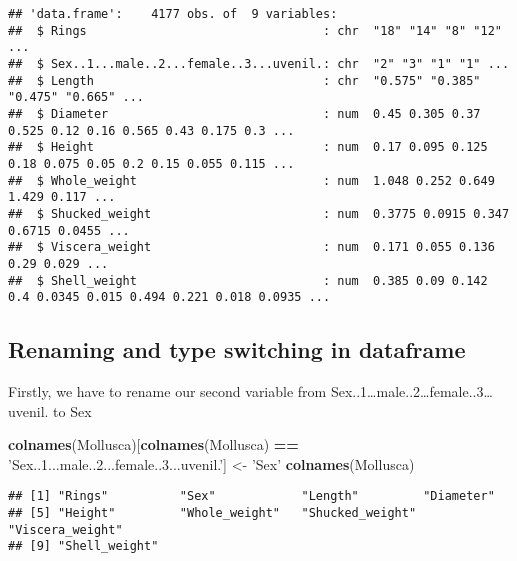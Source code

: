 \documentclass[
]{article}
\newenvironment{Shaded}{\begin{snugshade}}{\end{snugshade}}
\newcommand{\KeywordTok}[1]{\textcolor[rgb]{0.13,0.29,0.53}{\textbf{#1}}}
\newcommand{\NormalTok}[1]{#1}
\newcommand{\OperatorTok}[1]{\textcolor[rgb]{0.81,0.36,0.00}{\textbf{#1}}}
\newcommand{\StringTok}[1]{\textcolor[rgb]{0.31,0.60,0.02}{#1}}
\begin{document}
\begin{verbatim}
## 'data.frame':    4177 obs. of  9 variables:
##  $ Rings                                 : chr  "18" "14" "8" "12" ...
##  $ Sex..1...male..2...female..3...uvenil.: chr  "2" "3" "1" "1" ...
##  $ Length                                : chr  "0.575" "0.385" "0.475" "0.665" ...
##  $ Diameter                              : num  0.45 0.305 0.37 0.525 0.12 0.16 0.565 0.43 0.175 0.3 ...
##  $ Height                                : num  0.17 0.095 0.125 0.18 0.075 0.05 0.2 0.15 0.055 0.115 ...
##  $ Whole_weight                          : num  1.048 0.252 0.649 1.429 0.117 ...
##  $ Shucked_weight                        : num  0.3775 0.0915 0.347 0.6715 0.0455 ...
##  $ Viscera_weight                        : num  0.171 0.055 0.136 0.29 0.029 ...
##  $ Shell_weight                          : num  0.385 0.09 0.142 0.4 0.0345 0.015 0.494 0.221 0.018 0.0935 ...
\end{verbatim}

\hypertarget{renaming-and-type-switching-in-dataframe}{%
\subsection{Renaming and type switching in
dataframe}\label{renaming-and-type-switching-in-dataframe}}

Firstly, we have to rename our second variable from
Sex..1\ldots male..2\ldots female..3\ldots uvenil. to Sex

\begin{Shaded}
\begin{Highlighting}[]
\KeywordTok{colnames}\NormalTok{(Mollusca)[}\KeywordTok{colnames}\NormalTok{(Mollusca) }\OperatorTok{==}\StringTok{ 'Sex..1...male..2...female..3...uvenil.'}\NormalTok{] <-}\StringTok{ 'Sex'}
\KeywordTok{colnames}\NormalTok{(Mollusca)}
\end{Highlighting}
\end{Shaded}

\begin{verbatim}
## [1] "Rings"          "Sex"            "Length"         "Diameter"      
## [5] "Height"         "Whole_weight"   "Shucked_weight" "Viscera_weight"
## [9] "Shell_weight"
\end{verbatim}

\begin{Shaded}
\end{Shaded}
\end{document}
